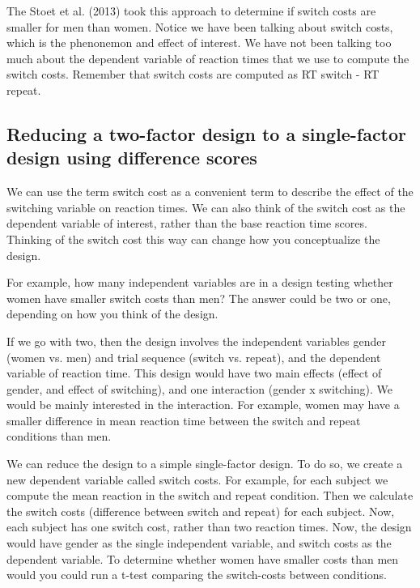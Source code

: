 The Stoet et al. (2013) took this approach to determine if switch costs are smaller for men than women. Notice we have been talking about switch costs, which is the phenonemon and effect of interest. We have not been talking too much about the dependent variable of reaction times that we use to compute the switch costs. Remember that switch costs are computed as RT switch - RT repeat.

\subsection{Reducing a two-factor design to a single-factor design using difference scores}

We can use the term switch cost as a convenient term to describe the effect of the switching variable on reaction times. We can also think of the switch cost as the dependent variable of interest, rather than the base reaction time scores. Thinking of the switch cost this way can change how you conceptualize the design.

For example, how many independent variables are in a design testing whether women have smaller switch costs than men? The answer could be two or one, depending on how you think of the design.

If we go with two, then the design involves the independent variables gender (women vs. men) and trial sequence (switch vs. repeat), and the dependent variable of reaction time. This design would have two main effects (effect of gender, and effect of switching), and one interaction (gender x switching). We would be mainly interested in the interaction. For example, women may have a smaller difference in mean reaction time between the switch and repeat conditions than men. 

We can reduce the design to a simple single-factor design. To do so, we create a new dependent variable called switch costs. For example, for each subject we compute the mean reaction in the switch and repeat condition. Then we  calculate the switch costs (difference between switch and repeat) for each subject. Now, each subject has one switch cost, rather than two reaction times. Now, the design would have gender as the single independent variable, and switch costs as the dependent variable. To determine whether women have smaller costs than men would you could run a t-test comparing the switch-costs between conditions.








